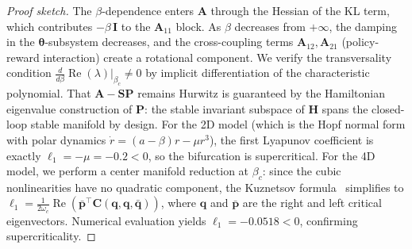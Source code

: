 \documentclass[10pt]{article}
\newcommand{\btheta}{\bm{\theta}}
\newcommand{\bp}{\bm{p}}
\newcommand{\bA}{\bm{A}}
\newcommand{\bP}{\bm{P}}
\newcommand{\bI}{\bm{I}}
\newcommand{\bS}{\bm{S}}
\begin{document}
\begin{proof}[Proof sketch]
The $\beta$-dependence enters $\bA$ through the Hessian of the KL term, which contributes $-\beta\,\bI$ to the $\bA_{11}$ block.
As $\beta$ decreases from $+\infty$, the damping in the $\btheta$-subsystem decreases, and the cross-coupling terms $\bA_{12}, \bA_{21}$ (policy-reward interaction) create a rotational component.
We verify the transversality condition $\frac{d}{d\beta}\operatorname{Re}(\lambda)\big|_{\beta_c} \neq 0$ by implicit differentiation of the characteristic polynomial.
That $\bA - \bS\bP$ remains Hurwitz is guaranteed by the Hamiltonian eigenvalue construction of $\bP$: the stable invariant subspace of $\bm{H}$ spans the closed-loop stable manifold by design.
For the 2D model (which is the Hopf normal form with polar dynamics $\dot{r} = (a-\beta)r - \mu r^3$), the first Lyapunov coefficient is exactly $\ell_1 = -\mu = -0.2 < 0$, so the bifurcation is supercritical.
For the 4D model, we perform a center manifold reduction at $\beta_c$: since the cubic nonlinearities have no quadratic component, the Kuznetsov formula~\citep{kuznetsov2004elements} simplifies to $\ell_1 = \tfrac{1}{2\omega_c}\operatorname{Re}(\bar{\bp}^\top \bm{C}(\bm{q},\bm{q},\bar{\bm{q}}))$, where $\bm{q}$ and $\bar{\bp}$ are the right and left critical eigenvectors.
Numerical evaluation yields $\ell_1 = -0.0518 < 0$, confirming supercriticality.
\end{proof}
\end{document}

